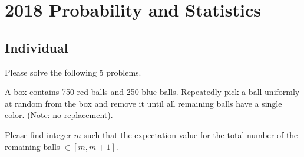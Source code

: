 \section{2018 Probability and Statistics}

\subsection{Individual}
Please solve the following 5 problems.

\begin{exercise}\label{probability:2018:1}
A box contains 750 red balls and 250 blue balls. Repeatedly pick a ball uniformly at random from the box and remove it until all remaining balls have a single color. (Note: no replacement).

Please find integer $m$ such that the expectation value for the total number of the remaining balls $\in [m, m+1]$.
\end{exercise}

